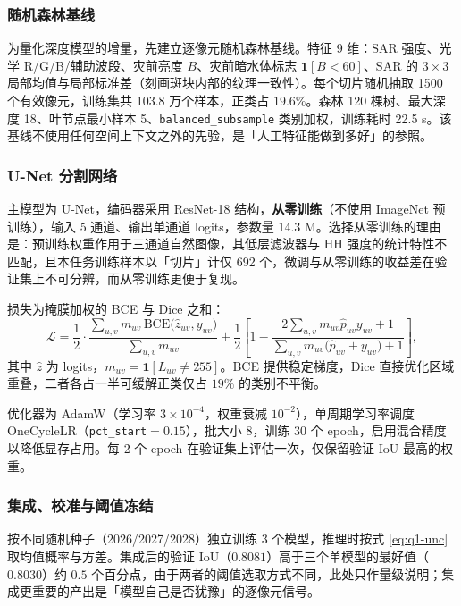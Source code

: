 \subsubsection{随机森林基线}

为量化深度模型的增量，先建立逐像元随机森林基线\cite{breiman2001rf}。特征 9 维：SAR 强度、光学 R/G/B/辅助波段、灾前亮度 $B$、灾前暗水体标志 $\mathbf{1}[B<60]$、SAR 的 $3\times3$ 局部均值与局部标准差（刻画斑块内部的纹理一致性）。每个切片随机抽取 1500 个有效像元，训练集共 103.8 万个样本，正类占 $19.6\%$。森林 120 棵树、最大深度 18、叶节点最小样本 5、\texttt{balanced\_subsample} 类别加权，训练耗时 22.5 s。该基线不使用任何空间上下文之外的先验，是「人工特征能做到多好」的参照。

\subsubsection{U-Net 分割网络}

主模型为 U-Net\cite{ronneberger2015unet}，编码器采用 ResNet-18\cite{he2016resnet} 结构，\textbf{从零训练}（不使用 ImageNet 预训练），输入 5 通道、输出单通道 logits，参数量 14.3 M。选择从零训练的理由是：预训练权重作用于三通道自然图像，其低层滤波器与 HH 强度的统计特性不匹配，且本任务训练样本以「切片」计仅 692 个，微调与从零训练的收益差在验证集上不可分辨，而从零训练更便于复现。

损失为掩膜加权的 BCE 与 Dice 之和：
\begin{equation}
\mathcal{L}=\frac{1}{2}\cdot
\frac{\sum_{u,v}m_{uv}\,\mathrm{BCE}\big(\hat z_{uv},y_{uv}\big)}{\sum_{u,v}m_{uv}}
+\frac{1}{2}\left[1-\frac{2\sum_{u,v}m_{uv}\hat p_{uv}y_{uv}+1}{\sum_{u,v}m_{uv}\big(\hat p_{uv}+y_{uv}\big)+1}\right],
\label{eq:q1-loss}
\end{equation}
其中 $\hat z$ 为 logits，$m_{uv}=\mathbf{1}[L_{uv}\ne255]$。BCE 提供稳定梯度，Dice 直接优化区域重叠，二者各占一半可缓解正类仅占 $19\%$ 的类别不平衡。

优化器为 AdamW（学习率 $3\times10^{-4}$，权重衰减 $10^{-2}$），单周期学习率调度 OneCycleLR（\texttt{pct\_start}$=0.15$），批大小 8，训练 30 个 epoch，启用混合精度以降低显存占用。每 2 个 epoch 在验证集上评估一次，仅保留验证 IoU 最高的权重。

\subsubsection{集成、校准与阈值冻结}

按不同随机种子（2026/2027/2028）独立训练 3 个模型，推理时按式 \eqref{eq:q1-unc} 取均值概率与方差。集成后的验证 IoU（$0.8081$）高于三个单模型的最好值（$0.8030$）约 $0.5$ 个百分点，由于两者的阈值选取方式不同，此处只作量级说明；集成更重要的产出是「模型自己是否犹豫」的逐像元信号\cite{lakshminarayanan2017ensembles}。

